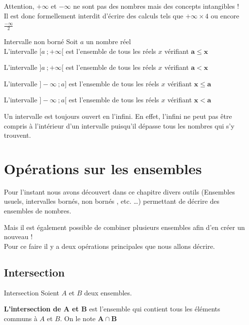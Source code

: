 \documentclass[oneside,12pt]{article}          %
\begin{document}
\begin{remarque}
	Attention, $+\infty$ et $-\infty$ ne sont pas des nombres mais des concepts intangibles !\\
	Il est donc formellement interdit d'écrire des calculs tels que $+\infty\times4$ ou encore $\frac{-\infty}{2}$
\end{remarque}


\begin{definition}{Intervalle non borné}    
    Soit $a$ un nombre réel \\[5pt]
    L'intervalle $[a~;+\infty[$ est l'ensemble de tous les réels $x$ vérifiant $\mathbold{ a \leq x}$ 
    
    L'intervalle $]a~;+\infty[ $ est l'ensemble de tous les réels $x$ vérifiant $\mathbold{ a < x}$ 
    
    L'intervalle $]-\infty~;a]$ est l'ensemble de tous les réels $x$ vérifiant $\mathbold{ x\leq a}$ 
    
    L'intervalle $]-\infty~;a[$ est l'ensemble de tous les réels $x$ vérifiant $\mathbold{ x < a}$    
\end{definition}


\begin{remarque}
    	Un intervalle est toujours ouvert en l'infini. En effet, l'infini ne peut pas être compris à l'intérieur d'un intervalle puisqu'il dépasse tous les nombres qui s'y trouvent.
\end{remarque}


\section{Opérations sur les ensembles}

Pour l'instant nous avons découvert dans ce chapitre divers outils (Ensembles usuels, intervalles bornés, non bornés , etc. \ldots) permettant de décrire des ensembles de nombres.

Mais il est également possible de combiner plusieurs ensembles afin d'en créer un nouveau !\\
Pour ce faire il y a deux opérations principales que nous allons décrire.

\subsection{Intersection}

\begin{definition}{Intersection}
	Soient $A$ et $B$ deux ensembles.
	
	\textbf{L'intersection de $\mathbold A$ et $\mathbold  B$} est l'ensemble qui contient tous les éléments communs à $A$ et $B$. On le note $\mathbold {A\cap B}$
\end{definition}
\end{document}
